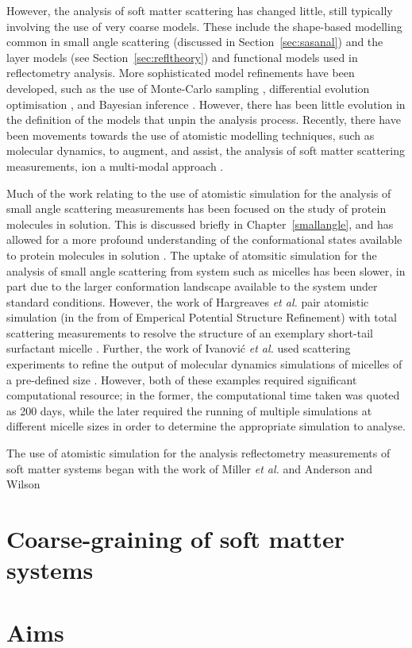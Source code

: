 However, the analysis of soft matter scattering has changed little, still typically involving the use of very coarse models.
These include the shape-based modelling common in small angle scattering (discussed in Section~\ref{sec:sasanal}) \cite{hassan_small_2003} and the layer models (see Section~\ref{sec:refltheory}) \cite{campbell_structure_2018} and functional models \cite{lu_analysis_1996} used in reflectometry analysis.
More sophisticated model refinements have been developed, such as the use of Monte-Carlo sampling \cite{pedersen_monte_2002}, differential evolution optimisation \cite{wormington_characterization_1999}, and Bayesian inference \cite{nelson_refnx_2019}.
However, there has been little evolution in the definition of the models that unpin the analysis process.
Recently, there have been movements towards the use of atomistic modelling techniques, such as molecular dynamics, to augment, and assist, the analysis of soft matter scattering measurements, ion a multi-modal approach \cite{scoppola_combining_2018}.

Much of the work relating to the use of atomistic simulation for the analysis of small angle scattering measurements has been focused on the study of protein molecules in solution.
This is discussed briefly in Chapter~\ref{smallangle}, and has allowed for a more profound understanding of the conformational states available to protein molecules in solution \cite{bowerman_determining_2017}.
The uptake of atomsitic simulation for the analysis of small angle scattering from system such as micelles has been slower, in part due to the larger conformation landscape available to the system under standard conditions.
However, the work of Hargreaves \emph{et al.} pair atomistic simulation (in the from of Emperical Potential Structure Refinement) with total scattering measurements to resolve the structure of an exemplary short-tail surfactant micelle \cite{hargreaves_atomistic_2011}.
Further, the work of Ivanovi\'{c} \emph{et al.} used scattering experiments to refine the output of molecular dynamics simulations of micelles of a pre-defined size \cite{ivanovic_temperature-dependent_2018}.
However, both of these examples required significant computational resource; in the former, the computational time taken was quoted as 200 days, while the later required the running of multiple simulations at different micelle sizes in order to determine the appropriate simulation to analyse.

The use of atomistic simulation for the analysis reflectometry measurements of soft matter systems began with the work of Miller \emph{et al.} and Anderson and Wilson \cite{miller_monte_2003} 

\section{Coarse-graining of soft matter systems}

\section{Aims}
